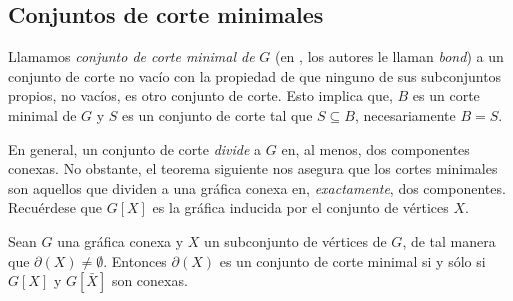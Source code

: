 \subsection{Conjuntos de corte minimales}

Llamamos \textit{conjunto de corte minimal de}  $G$ (en \cite{Bondy}, los autores le llaman \textit{bond}) a un conjunto de corte no vacío con la propiedad de que ninguno de sus subconjuntos propios, no vacíos, es otro conjunto de corte. Esto implica que, $B$ es un corte minimal de $G$ y $S$ es un conjunto de corte tal que $S\subseteq B$, necesariamente $B=S$.

 En general, un conjunto de corte \textit{divide} a $G$ en, al menos, dos componentes conexas. No obstante, el teorema siguiente nos asegura que los cortes minimales son aquellos que dividen a una gráfica conexa en, \textit{exactamente}, dos componentes. Recuérdese que $G[X]$ es la gráfica inducida por el conjunto de vértices $X$.

\begin{teo} \label{teo:caracterizacionbond}
Sean $G$ una gráfica conexa y $X$ un subconjunto de vértices de $G$, de tal manera que $\partial(X) \neq \emptyset$. Entonces $\partial(X)$ es un conjunto de corte minimal si y sólo si $G[X]$ y $G[\bar{X}]$ son conexas. 
\end{teo}


